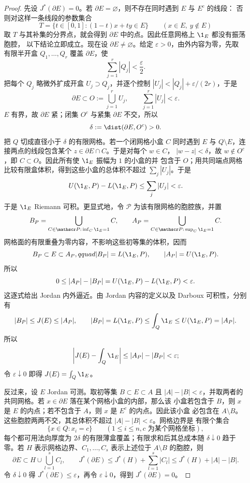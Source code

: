\begin{proof}
先设 $J^*(\partial E)=0$。若 $\partial E=\varnothing$，则不存在同时遇到 $E$ 与 $E^c$ 的线段：
否则对这样一条线段的参数集合
\[
 T=\{t\in[0,1]:(1-t)x+ty\in E\}\qquad(x\in E,\ y\notin E)
\]
取 $T$ 与其补集的分界点，就会得到 $\partial E$ 中的点。因此任意网格上 $\1_E$ 都没有振荡胞腔，
以下结论立即成立。现在设 $\partial E\ne\varnothing$。给定 $\varepsilon>0$，由外内容为零，先取
有限半开盒 $Q_1,\dots,Q_r$ 覆盖 $\partial E$，使
\[
 \sum_{j=1}^r|Q_j|<\frac{\varepsilon}{2}.
\]
把每个 $Q_j$ 略微外扩成开盒 $U_j\supset Q_j$，并逐个控制
$|U_j|<|Q_j|+\varepsilon/(2r)$，于是
\[
 \partial E\subset O:=\bigcup_{j=1}^rU_j,
 \qquad \sum_{j=1}^r|U_j|<\varepsilon.
\]
$E$ 有界，故 $\partial E$ 紧；闭集 $O^c$ 与紧集 $\partial E$ 不交，所以
\[
 \delta:=\dist(\partial E,O^c)>0.
\]
把 $Q$ 切成直径小于 $\delta$ 的有限网格。若一个闭网格小盒 $C$ 同时遇到 $E$ 与
$Q\setminus E$，连接两点的线段包含某个 $z\in\partial E\cap C$。于是对每个 $w\in C$，
$|w-z|<\delta$，故 $w\notin O^c$，即 $C\subset O$。因此所有使 $\1_E$ 振幅为 $1$ 的小盒的并
包含于 $O$；用共同端点网格比较有限盒体积，得到这些小盒的总体积不超过
$\sum_j|U_j|$。于是
\[
 U(\1_E,P)-L(\1_E,P)\le\sum_j|U_j|<\varepsilon.
\]
于是 $\1_E$ Riemann 可积。更显式地，令 $\mathscr P$ 为该有限网格的胞腔族，并置
\[
 B_P=\bigcup_{C\in\mathscr P:\,\inf_C\1_E=1}C,
 \qquad
 A_P=\bigcup_{C\in\mathscr P:\,\sup_C\1_E=1}C.
\]
网格面的有限重叠为零内容，不影响这些初等集的体积，因而
\[
 B_P\subset E\subset A_P,qquad
 |B_P|=L(\1_E,P),\qquad |A_P|=U(\1_E,P).
\]
所以
\[
 0\le |A_P|-|B_P|=U(\1_E,P)-L(\1_E,P)<\varepsilon.
\]
这逐式给出 Jordan 内外逼近。由 Jordan 内容的定义以及 Darboux 可积性，分别有
\[
 |B_P|\le J(E)\le |A_P|,
 \qquad
 |B_P|=L(\1_E,P)\le\int_Q\1_E\le U(\1_E,P)=|A_P|.
\]
所以
\[
 \left|J(E)-\int_Q\1_E\right|
 \le |A_P|-|B_P|<\varepsilon;
\]
令 $\varepsilon\downarrow0$ 即得 $J(E)=\int_Q\1_E$。

反过来，设 $E$ Jordan 可测。取初等集 $B\subset E\subset A$ 且
$|A|-|B|<\varepsilon$，并取两者的共同网格。若 $x\in\partial E$ 落在某个网格小盒的内部，那么该
小盒若包含于 $B$，则 $x$ 是 $E$ 的内点；若不包含于 $A$，则 $x$ 是 $E^c$ 的内点。因此该小盒
必包含在 $A\setminus B$。这些胞腔两两不交，其总体积不超过 $|A|-|B|<\varepsilon$。网格边界是
有限个集合
\[
 \{x\in Q:x_i=c\}\qquad(1\le i\le n, c\text{ 为某个网格坐标}),
\]
每个都可用法向厚度为 $2\delta$ 的有限薄盒覆盖；有限求和后其总成本随 $\delta\downarrow0$ 趋于
零。若 $H$ 表示网格边界、$C_1,\dots,C_s$ 表示上述位于 $A\setminus B$ 的胞腔，则
\[
 \partial E\subset H\cup\bigcup_{l=1}^sC_l,
 \qquad
 J^*(\partial E)
 \le J^*(H)+\sum_{l=1}^s|C_l|
 \le J^*(H)+|A|-|B|.
\]
令 $\delta\downarrow0$ 得 $J^*(\partial E)\le\varepsilon$，再令 $\varepsilon\downarrow0$，得到
$J^*(\partial E)=0$。
\end{proof}

